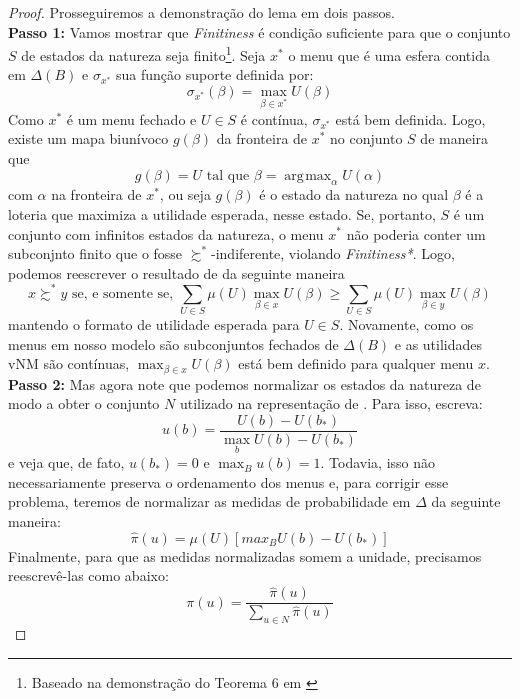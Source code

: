 \documentclass[11pt, a4paper]{article}
\theoremstyle{nonumberplain}
\newtheorem{proof}{Dem.}
\theoremstyle{plain}
\theoremstyle{plain}
\theoremstyle{plain}
\DeclareMathOperator*{\argmax}{\arg\!\max}
\begin{document}
\begin{proof}
Prosseguiremos a demonstração do lema em dois passos.\\
\textbf{Passo 1:} Vamos mostrar que \emph{Finitiness} é condição suficiente para que o conjunto $S$ de estados da natureza seja finito\footnote{Baseado na demonstração do Teorema 6 em \cite{Dekel2009}}. Seja $x^*$ o menu que é uma esfera contida em $\Delta(B)$ e $\sigma_{x^*}$ sua função suporte definida por: $$\sigma_{x^*}(\beta)=\max_{\beta\in x^*} U(\beta) $$ Como $x^*$ é um menu fechado e $U\in S$ é contínua, $\sigma_{x^*}$ está bem definida. Logo, existe um mapa biunívoco $g(\beta)$ da fronteira de $x^*$ no conjunto $S$ de maneira que $$g(\beta)=U\text{ tal que } \beta=\argmax_{\alpha}U(\alpha)$$ com $\alpha$ na fronteira de $x^*$, ou seja $g(\beta)$ é o estado da natureza no qual $\beta$ é a loteria que maximiza a utilidade esperada, nesse estado. Se, portanto, $S$ é um conjunto com infinitos estados da natureza, o menu $x^*$ não poderia conter um subconjnto finito que o fosse $\succsim^*$-indiferente, violando \emph{Finitiness*}. Logo, podemos reescrever o resultado de \cite{Kochov2007} da seguinte maneira $$x\succsim^* y \text{ se, e somente se, } \sum_{U\in S} \mu(U)\max_{\beta\in x}U(\beta) \geq \sum_{U\in S} \mu(U)\max_{\beta\in y}U(\beta)$$ 
mantendo o formato de utilidade esperada para $U\in S$. Novamente, como os menus em nosso modelo são subconjuntos fechados de $\Delta(B)$ e as utilidades vNM são contínuas, $\max_{\beta\in x}U(\beta)$ está bem definido para qualquer menu $x$.\\

\noindent
\textbf{Passo 2:} Mas agora note que podemos normalizar os estados da natureza de modo a obter o conjunto $N$ utilizado na representação de \cite{Epstein2007}. Para isso, escreva:
$$u(b)=\frac{U(b)-U(b_*)}{\max_b U(b)-U(b_*)}$$  
e veja que, de fato, $u(b_*)=0$ e $\max_{B} u(b)=1$. Todavia, isso não necessariamente preserva o ordenamento dos menus e, para corrigir esse problema, teremos de normalizar as medidas de probabilidade em $\Delta$ da seguinte maneira:
$$ \hat{\pi}(u)=\mu(U)\left[max_B U(b)-U(b_*)\right]$$ Finalmente, para que as medidas normalizadas somem a unidade, precisamos reescrevê-las como abaixo:  \[\pi(u)=\frac{\hat{\pi}(u)}{\sum_{u\in N}\hat{\pi}(u)}\]
\end{proof}
\end{document}
